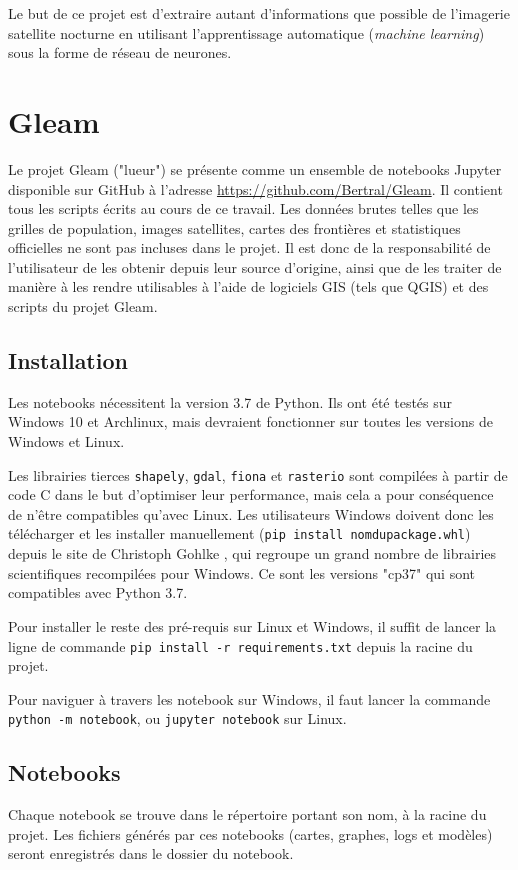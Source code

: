 \documentclass[a4paper, 11pt]{report}
\begin{document}
Le but de ce projet est d'extraire autant d'informations que possible de l'imagerie satellite nocturne en utilisant l'apprentissage automatique (\textit{machine learning}) sous la forme de réseau de neurones.

\chapter{Gleam}

Le projet Gleam ("lueur") se présente comme un ensemble de notebooks Jupyter disponible sur GitHub à l'adresse \url{https://github.com/Bertral/Gleam}. Il contient tous les scripts écrits au cours de ce travail. Les données brutes telles que les grilles de population, images satellites, cartes des frontières et statistiques officielles ne sont pas incluses dans le projet. Il est donc de la responsabilité de l'utilisateur de les obtenir depuis leur source d'origine, ainsi que de les traiter de manière à les rendre utilisables à l'aide de logiciels GIS (tels que QGIS) et des scripts du projet Gleam.

\section{Installation}
Les notebooks nécessitent la version 3.7 de Python. Ils ont été testés sur Windows 10 et Archlinux, mais devraient fonctionner sur toutes les versions de Windows et Linux.

Les librairies tierces \texttt{shapely}, \texttt{gdal}, \texttt{fiona} et \texttt{rasterio} sont compilées à partir de code C dans le but d'optimiser leur performance, mais cela a pour conséquence de n'être compatibles qu'avec Linux. Les utilisateurs Windows doivent donc les télécharger et les installer manuellement (\texttt{pip install nomdupackage.whl}) depuis le site de  Christoph Gohlke \cite{winlibs}, qui regroupe un grand nombre de librairies scientifiques recompilées pour Windows. Ce sont les versions "cp37" qui sont compatibles avec Python 3.7. 

Pour installer le reste des pré-requis sur Linux et Windows, il suffit de lancer la ligne de commande \texttt{pip install -r requirements.txt} depuis la racine du projet.

Pour naviguer à travers les notebook sur Windows, il faut lancer la commande \texttt{python -m notebook}, ou \texttt{jupyter notebook} sur Linux.

\section{Notebooks}
Chaque notebook se trouve dans le répertoire portant son nom, à la racine du projet. Les fichiers générés par ces notebooks (cartes, graphes, logs et modèles) seront enregistrés dans le dossier du notebook.
\end{document}
